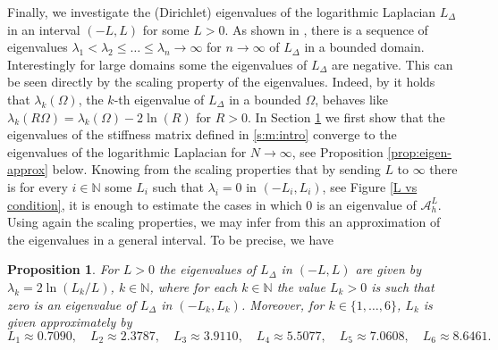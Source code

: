 \documentclass[10 pt]{article}
\newtheorem{proposition}[theorem]{Proposition}
\numberwithin{equation}{section}
\def\N{\mathbb{N}}
\newcommand{\SJ}[1]{{\color{ForestGreen} #1}}  %
\begin{document}
\SJ{Finally, we investigate the (Dirichlet) eigenvalues of the logarithmic Laplacian $L_{\Delta}$ in an interval $(-L,L)$ for some $L>0$. As shown in \cite[Theorem 1.4]{CW19}, there is a sequence of eigenvalues $\lambda_1<\lambda_2\leq \ldots\leq\lambda_n\to \infty$ for $n\to\infty$ of $L_{\Delta}$ in a bounded domain. Interestingly for large domains some the eigenvalues of $L_{\Delta}$ are negative. This can be seen directly by the scaling property of the eigenvalues. Indeed, by \cite[Lemma 2.5]{LW21} it holds that $\lambda_k(\Omega)$, the $k$-th eigenvalue of $L_{\Delta}$ in a bounded $\Omega$, behaves like $\lambda_k(R\Omega)=\lambda_k(\Omega)-2\ln(R)$ for $R>0$. In Section \ref{eigenvalue approximation} we first show that the eigenvalues of the stiffness matrix defined in \eqref{s:m:intro} converge to the eigenvalues of the logarithmic Laplacian for $N\to \infty$, see Proposition \ref{prop:eigen-approx} below. Knowing from the scaling properties that by sending $L$ to $\infty$ there is for every $i\in \N$ some $L_i$ such that $\lambda_i=0$ in $(-L_i,L_i)$, see Figure \ref{L vs condition}, it is enough to estimate the cases in which $0$ is an eigenvalue of $\mathcal{A}^L_h$. Using again the scaling properties, we may infer from this an approximation of the eigenvalues in a general interval. To be precise, we have
\begin{proposition}\label{eigenvalue approximation}
For $L>0$ the eigenvalues of $L_{\Delta}$ in $(-L,L)$ are given by $\lambda_k=2\ln(L_k/L)$, $k\in \N$, where for each $k\in \N$ the value $L_k>0$ is such that zero is an eigenvalue of $L_{\Delta}$ in $(-L_k,L_k)$. Moreover, for $k\in\{1,\ldots,6\}$, $L_k$ is given approximately by
\begin{equation*}
L_1\approx 0.7090, \quad L_2\approx 2.3787,\quad L_3\approx 3.9110,\quad L_4\approx 5.5077, \quad L_5\approx 7.0608,\quad L_6\approx 8.6461.
\end{equation*}
\end{proposition}
%

}
\end{document}
